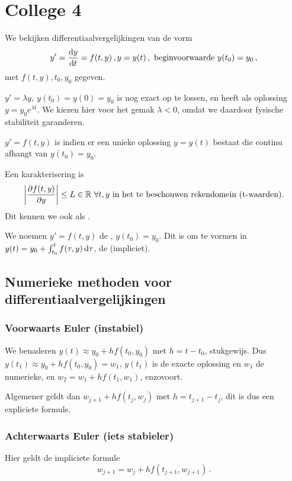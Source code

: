\documentclass{2wn20summary}
\begin{document}
	\newpage
	\section{College 4}
		We bekijken differentiaalvergelijkingen van de vorm
		\[
			y' = \frac{\mathop{}\!\mathrm{d} y}{\mathop{}\!\mathrm{d} t} = f(t,y) \,, y = y(t) \,, \text{ beginvoorwaarde } y(t_0) = y_0 \,,
		 \]
		 met $f(t,y),t_0,y_0$ gegeven.

		 \begin{voorbeeld}

		 	$y'=\lambda y,\ y(t_0)=y(0)=y_0$ is nog exact op te lossen, en heeft als oplossing $y=y_0 e^{\lambda t}$. We kiezen hier voor het gemak $\lambda <0$, omdat we daardoor fysische stabiliteit garanderen.
		 \end{voorbeeld}
		 \begin{define}
		 	$y'=f(t,y)$ is  indien er een unieke oplossing $y=y(t)$ bestaat die continu afhangt van $y(t_0)=y_0$.

		 	Een karakterisering is
		 	\[
			 	{\left|\frac{\partial f(t,y)}{\partial y}\right|} \le L \in \mathbb{R} \ \forall{t,y} \text{ in het te beschouwen rekendomein (t-waarden)}.
		 	 \]
		 	 Dit kennen we ook als .
		 \end{define}

		 \begin{define}
		 	We noemen $y'=f(t,y)$ de , $y(t_0) = y_0$. Dit is om te vormen in $y(t) = y_0 + \int_{t_0}^t f(\tau,y) \mathop{}\!\mathrm{d} \tau$, de  (impliciet).
		 \end{define}

		 \subsection{Numerieke methoden voor differentiaalvergelijkingen}
		 \subsubsection{Voorwaarts Euler (instabiel)}
			 We benaderen $y(t) \approx y_0 + h f(t_0,y_0)$ met $h=t-t_0$, stukgewijs. Dus $y(t_1) \approx y_0 + h f(t_0,y_0) = w_1$, $y(t_1)$ is de exacte oplossing en $w_1$ de numerieke, en $w_2 = w_1 + h f(t_1,w_1)$, enzovoort.

			 Algemener geldt dan $w_{j+1}+h f(t_j,w_j)$ met $h=t_{j+1}-t_j$, dit is dus een expliciete formule.
		\subsubsection{Achterwaarts Euler (iets stabieler)}
			Hier geldt de impliciete formule
			\[
				w_{j+1} = w_j + h f(t_{j+1},w_{j+1}) \,.
			 \]
\end{document}
